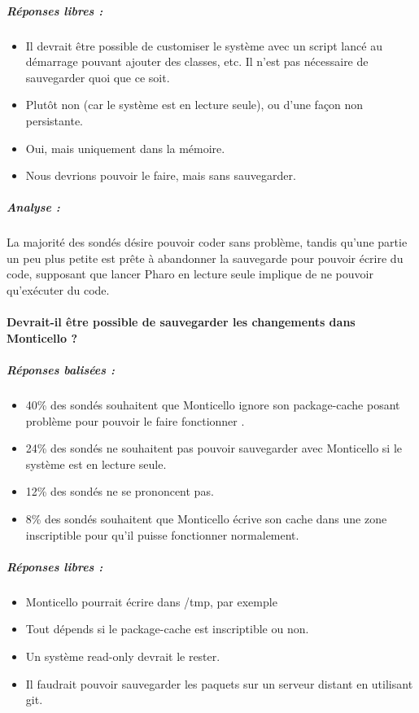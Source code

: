 \subparagraph{Réponses libres :}
\begin{itemize}
	\item Il devrait être possible de customiser le système avec un script lancé au démarrage pouvant ajouter des classes, etc. Il n'est pas nécessaire de sauvegarder quoi que ce soit.
	\item Plutôt non (car le système est en lecture seule), ou d'une façon non persistante.
	\item Oui, mais uniquement dans la mémoire.
	\item Nous devrions pouvoir le faire, mais sans sauvegarder.
\end{itemize}

\subparagraph{Analyse :}
La majorité des sondés désire pouvoir coder sans problème, tandis qu'une partie un peu plus petite est prête à abandonner la sauvegarde pour pouvoir écrire du code, supposant que lancer Pharo en lecture seule implique de ne pouvoir qu'exécuter du code.

\paragraph{Devrait-il être possible de sauvegarder les changements dans Monticello ?}
\subparagraph{Réponses balisées :}
\begin{itemize}
	\item 40\% des sondés souhaitent que Monticello ignore son package-cache posant problème pour pouvoir le faire fonctionner .
	\item 24\% des sondés ne souhaitent pas pouvoir sauvegarder avec Monticello si le système est en lecture seule.
	\item 12\% des sondés ne se prononcent pas.
	\item 8\% des sondés souhaitent que Monticello écrive son cache dans une zone inscriptible pour qu'il puisse fonctionner normalement.
\end{itemize}

\subparagraph{Réponses libres :}
\begin{itemize}
	\item Monticello pourrait écrire dans /tmp, par exemple
	\item Tout dépends si le package-cache est inscriptible ou non.
	\item Un système read-only devrait le rester.
	\item Il faudrait pouvoir sauvegarder les paquets sur un serveur distant en utilisant git.
\end{itemize}

